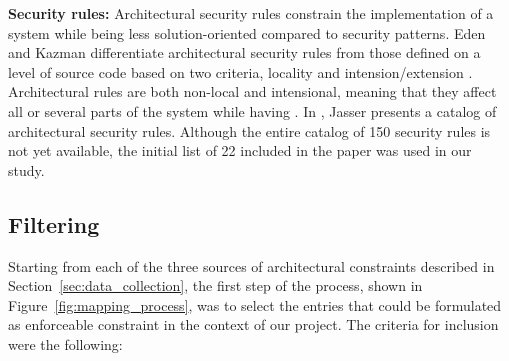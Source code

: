 \textbf{Security rules:} \label{subsec:security_rules}
Architectural security rules constrain the implementation of a system while being less solution-oriented compared to security patterns. Eden and Kazman differentiate architectural security rules from those defined on a level of source code based on two criteria, locality and intension/extension \cite{eden_architecture_2003}. Architectural rules are both non-local and intensional, meaning that they affect all or several parts of the system while having . In \cite{franch_constraining_2019}, Jasser presents a catalog of architectural security rules. Although the entire catalog of 150 security rules is not yet available, the initial list of 22 included in the paper was used in our study.

\subsection{Filtering}\label{sec:processing}

Starting from each of the three sources of architectural constraints described in Section~\ref{sec:data_collection}, the first step of the process, shown in Figure~\ref{fig:mapping_process}, was to select the entries that could be formulated as enforceable constraint in the context of our project. The criteria for inclusion were the following: 

